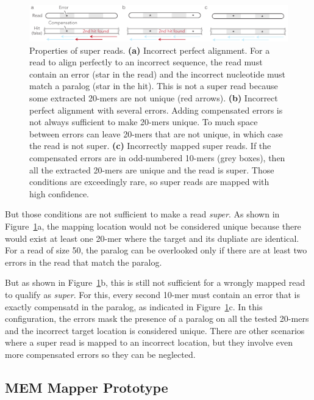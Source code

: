 \documentclass[a4,center,fleqn]{NAR}
\begin{document}
\begin{figure}[t]
\begin{center}
\includegraphics[scale=.79]{super_reads.pdf}
\end{center}
\caption{Properties of super reads. \textbf{(a)} Incorrect perfect
alignment. For a read to align perfectly to an incorrect sequence, the
read must contain an error (star in the read) and the incorrect nucleotide
must match a paralog (star in the hit). This is not a super read because
some extracted 20-mers are not unique (red arrows). \textbf{(b)} Incorrect
perfect alignment with several errors. Adding compensated errors is not
always sufficient to make 20-mers unique. To much space between errors can
leave 20-mers that are not unique, in which case the read is not super.
\textbf{(c)} Incorrectly mapped super reads. If the compensated errors are
in odd-numbered 10-mers (grey boxes), then all the extracted 20-mers are
unique and the read is super. Those conditions are exceedingly rare, so
super reads are mapped with high confidence.}
\label{fig_supread}
\end{figure}

But those conditions are not sufficient to make a read \emph{super}. As
shown in Figure~\ref{fig_supread}a, the mapping location would not be
considered unique because there would exist at least one 20-mer where the
target and its dupliate are identical. For a read of size 50, the
paralog can be overlooked only if there are at least two errors in the
read that match the paralog.

But as shown in Figure~\ref{fig_supread}b, this is still not sufficient
for a wrongly mapped read to qualify as \emph{super}. For this, every
second 10-mer must contain an error that is exactly compensatd in the
paralog, as indicated in Figure~\ref{fig_supread}c. In this
configuration, the errors mask the presence of a paralog on all the
tested 20-mers and the incorrect target location is considered unique.
There are other scenarios where a super read is mapped to an incorrect
location, but they involve even more compensated errors so they can be
neglected.


\subsection{MEM Mapper Prototype}
\end{document}
